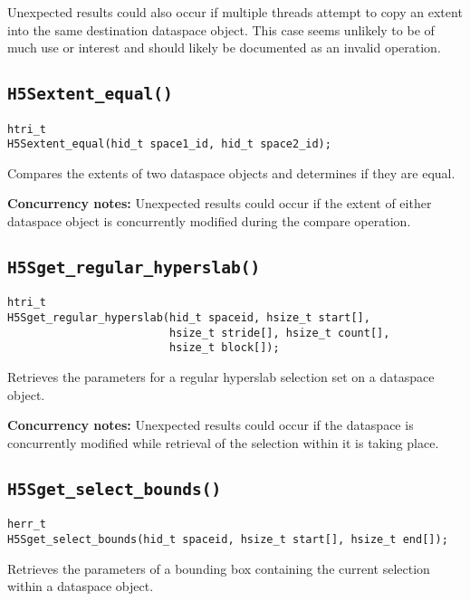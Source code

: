 \documentclass[../HDF5_RFC.tex]{subfiles}
\begin{document}
Unexpected results could also occur if multiple threads attempt to copy an extent into the
same destination dataspace object. This case seems unlikely to be of much use or interest
and should likely be documented as an invalid operation.

\subsection{\texttt{H5Sextent\_equal()}}
\label{apdx:h5s_func_h5sextent_equal}

\begin{verbatim}
htri_t
H5Sextent_equal(hid_t space1_id, hid_t space2_id);
\end{verbatim}

Compares the extents of two dataspace objects and determines if they are equal.

\textbf{Concurrency notes:} Unexpected results could occur if the extent of either dataspace
object is concurrently modified during the compare operation.

\subsection{\texttt{H5Sget\_regular\_hyperslab()}}
\label{apdx:h5s_func_h5sget_regular_hyperslab}

\begin{verbatim}
htri_t
H5Sget_regular_hyperslab(hid_t spaceid, hsize_t start[],
                         hsize_t stride[], hsize_t count[],
                         hsize_t block[]);
\end{verbatim}

Retrieves the parameters for a regular hyperslab selection set on a dataspace object.

\textbf{Concurrency notes:} Unexpected results could occur if the dataspace is concurrently
modified while retrieval of the selection within it is taking place.

\subsection{\texttt{H5Sget\_select\_bounds()}}
\label{apdx:h5s_func_h5sget_select_bounds}

\begin{verbatim}
herr_t
H5Sget_select_bounds(hid_t spaceid, hsize_t start[], hsize_t end[]);
\end{verbatim}

Retrieves the parameters of a bounding box containing the current selection within a
dataspace object.
\end{document}
